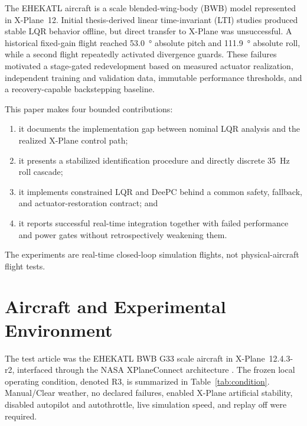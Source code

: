 \documentclass[conference]{IEEEtran}
\begin{document}
The EHEKATL aircraft is a scale blended-wing-body (BWB) model represented in
X-Plane~12. Initial thesis-derived linear time-invariant (LTI) studies produced
stable LQR behavior offline, but direct transfer to X-Plane was unsuccessful.
A historical fixed-gain flight reached \SI{53.0}{\degree} absolute pitch and
\SI{111.9}{\degree} absolute roll, while a second flight repeatedly activated
divergence guards. These failures motivated a stage-gated redevelopment based
on measured actuator realization, independent training and validation data,
immutable performance thresholds, and a recovery-capable backstepping
baseline.

This paper makes four bounded contributions:
\begin{enumerate}
    \item it documents the implementation gap between nominal LQR analysis and
    the realized X-Plane control path;
    \item it presents a stabilized identification procedure and directly
    discrete \SI{35}{\hertz} roll cascade;
    \item it implements constrained LQR and DeePC behind a common safety,
    fallback, and actuator-restoration contract; and
    \item it reports successful real-time integration together with failed
    performance and power gates without retrospectively weakening them.
\end{enumerate}
The experiments are real-time closed-loop simulation flights, not
physical-aircraft flight tests.

\section{Aircraft and Experimental Environment}
The test article was the EHEKATL BWB G33 scale aircraft in X-Plane~12.4.3-r2,
interfaced through the NASA XPlaneConnect architecture \cite{nasaXPC}. The
frozen local operating condition, denoted R3, is summarized in
Table~\ref{tab:condition}. Manual/Clear weather, no declared failures, enabled
X-Plane artificial stability, disabled autopilot and autothrottle, live
simulation speed, and replay off were required.
\end{document}
